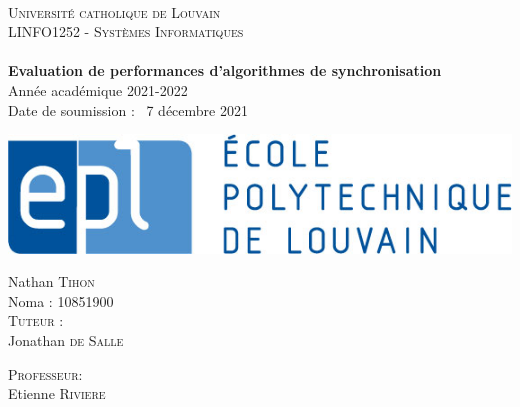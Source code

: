 



\begin{titlepage}
  \begin{sffamily}
  \begin{center}

    ~\\[0.5cm]\textsc{\LARGE Université catholique de Louvain}\\[0.5cm]
    
    \textsc{\Large LINFO1252 - Systèmes Informatiques }\\[2cm]

    \HRule \\[0.7cm]
    \textbf{ \huge Evaluation de performances d'algorithmes de synchronisation } \\[4mm]
    \Large{Année académique 2021-2022} \\[2mm]
    \large{Date de soumission : \ 7 décembre 2021}
    \HRule \\[2cm]
    
    \begin{center}
        \includegraphics[scale=0.65]{img/epl-logo.jpg}
    \end{center}
    \vspace{2cm}
    \begin{minipage}{1.0\textwidth}
      \begin{center} \large
        Nathan \textsc{Tihon} \\[0.1cm]
        Noma : \textsc{10851900}\\
        \vspace{0.5cm}
        \textsc{Tuteur :} \\[0.1cm]
        Jonathan \textsc{de Salle}
        \vspace{0.5cm}
        
        \textsc{Professeur:}\\[0.1cm]
         Etienne \textsc{Riviere} \\
      \end{center}
    \end{minipage}
    \\[0.3cm]

    \vfill
{\large }%
  \end{center}
  \end{sffamily}
\end{titlepage}

